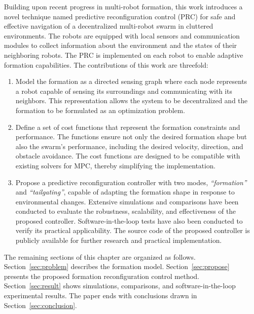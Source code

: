 Building upon recent progress in multi-robot formation, this work introduces a novel technique named predictive reconfiguration control (PRC) for safe and effective navigation of a decentralized multi-robot swarm in cluttered environments. The robots are equipped with local sensors and communication modules to collect information about the environment and the states of their neighboring robots. The PRC is implemented on each robot to enable adaptive formation capabilities. The contributions of this work are threefold:
\begin{enumerate}
    \item Model the formation as a directed sensing graph where each node represents a robot capable of sensing its surroundings and communicating with its neighbors. This representation allows the system to be decentralized and the formation to be formulated as an optimization problem.
    \item Define a set of cost functions that represent the formation constraints and performance. The functions ensure not only the desired formation shape but also the swarm's performance, including the desired velocity, direction, and obstacle avoidance. The cost functions are designed to be compatible with existing solvers for MPC, thereby simplifying the implementation.
    \item Propose a predictive reconfiguration controller with two modes, \textit{``formation''} and \textit{``tailgating''}, capable of adapting the formation shape in response to environmental changes. Extensive simulations and comparisons have been conducted to evaluate the robustness, scalability, and effectiveness of the proposed controller. Software-in-the-loop tests have also been conducted to verify its practical applicability. The source code of the proposed controller is publicly available for further research and practical implementation.
\end{enumerate}

The remaining sections of this chapter are organized as follows. Section~\ref{sec:problem} describes the formation model. Section~\ref{sec:propose} presents the proposed formation reconfiguration control method. Section~\ref{sec:result} shows simulations, comparisons, and software-in-the-loop experimental results. The paper ends with conclusions drawn in Section~\ref{sec:conclusion}.
